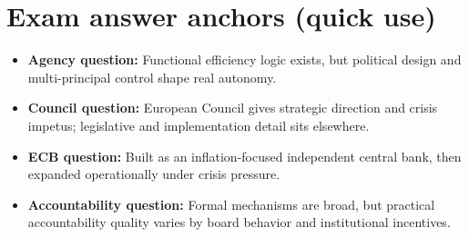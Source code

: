 \documentclass[12pt]{article}
\begin{document}
\section*{Exam answer anchors (quick use)}

\begin{itemize}
    \item \textbf{Agency question:} Functional efficiency logic exists, but political design and multi-principal control shape real autonomy.
    \item \textbf{Council question:} European Council gives strategic direction and crisis impetus; legislative and implementation detail sits elsewhere.
    \item \textbf{ECB question:} Built as an inflation-focused independent central bank, then expanded operationally under crisis pressure.
    \item \textbf{Accountability question:} Formal mechanisms are broad, but practical accountability quality varies by board behavior and institutional incentives.
\end{itemize}
\end{document}
